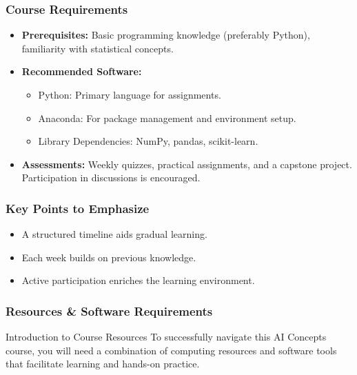 \documentclass[aspectratio=169]{beamer}
\begin{document}
\begin{frame}[fragile]
    \frametitle{Course Requirements}
    \begin{itemize}
        \item \textbf{Prerequisites:} Basic programming knowledge (preferably Python), familiarity with statistical concepts.
        \item \textbf{Recommended Software:}
            \begin{itemize}
                \item Python: Primary language for assignments.
                \item Anaconda: For package management and environment setup.
                \item Library Dependencies: NumPy, pandas, scikit-learn.
            \end{itemize}
        \item \textbf{Assessments:} Weekly quizzes, practical assignments, and a capstone project. Participation in discussions is encouraged.
    \end{itemize}
\end{frame}

\begin{frame}[fragile]
    \frametitle{Key Points to Emphasize}
    \begin{itemize}
        \item A structured timeline aids gradual learning.
        \item Each week builds on previous knowledge.
        \item Active participation enriches the learning environment.
    \end{itemize}
\end{frame}

\begin{frame}[fragile]
    \frametitle{Resources \& Software Requirements}
    \begin{block}{Introduction to Course Resources}
        To successfully navigate this AI Concepts course, you will need a combination of computing resources and software tools that facilitate learning and hands-on practice.
    \end{block}
\end{frame}
\end{document}

